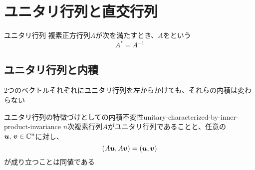 \documentclass[../../../topic_linear-algebra]{subfiles}
\begin{document}
\sectionline
\section{ユニタリ行列と直交行列}

\begin{definition}{ユニタリ行列}\label{def:unitary-matrix}
  複素正方行列$A$が次を満たすとき、$A$をという
  \begin{equation*}
    A^* = A^{-1}
  \end{equation*}
\end{definition}

\subsection{ユニタリ行列と内積}

2つのベクトルそれぞれにユニタリ行列を左からかけても、それらの内積は変わらない

\begin{theorem}{ユニタリ行列の特徴づけとしての内積不変性}{unitary-characterized-by-inner-product-invariance}
  $n$次複素行列$A$がユニタリ行列であることと、任意の$\vb*{u},\,\vb*{v} \in \mathbb{C}^n$に対し、
  \begin{equation*}
    (A\vb*{u}, A\vb*{v}) = (\vb*{u}, \vb*{v})
  \end{equation*}
  が成り立つことは同値である
\end{theorem}
\end{document}

